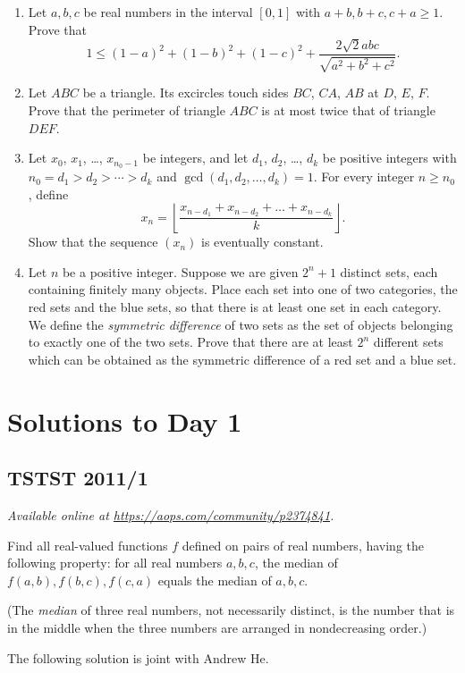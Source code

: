 \documentclass[11pt]{scrartcl}
\begin{document}
\begin{enumerate}[\bfseries 1.]
\item %
Let $a,b,c$ be real numbers in the interval $[0,1]$
with $a+b,b+c,c+a \ge 1$.  Prove that
\[ 1 \le (1-a)^2 + (1-b)^2 + (1-c)^2
  + \frac{2\sqrt2 abc}{\sqrt{a^2+b^2+c^2}}. \]

\item %
Let $ABC$ be a triangle.
Its excircles touch sides $BC$, $CA$, $AB$ at $D$, $E$, $F$.
Prove that the perimeter of triangle $ABC$ is
at most twice that of triangle $DEF$.

\item %
Let $x_0$, $x_1$, \dots, $x_{n_0-1}$ be integers,
and let $d_1$, $d_2$, \dots, $d_k$ be positive integers
with $n_0 = d_1 > d_2 > \dotsb > d_k$ and
$\gcd(d_1, d_2, \dots, d_k) = 1$.
For every integer $n \geq n_0$, define
\[ x_n = \left\lfloor \frac{x_{n-d_1} + x_{n-d_2}
  + \dots + x_{n-d_k}}{k} \right\rfloor. \]
Show that the sequence $(x_n)$ is eventually constant.

\item %
Let $n$ be a positive integer.
Suppose we are given $2^n+1$ distinct sets,
each containing finitely many objects.
Place each set into one of two categories, the red sets and the blue sets,
so that there is at least one set in each category.
We define the \textit{symmetric difference} of two sets as
the set of objects belonging to exactly one of the two sets.
Prove that there are at least $2^n$ different sets which
can be obtained as the symmetric difference of a red set and a blue set.

\end{enumerate}
\pagebreak

\section{Solutions to Day 1}
\subsection{TSTST 2011/1}
\textsl{Available online at \url{https://aops.com/community/p2374841}.}
\begin{mdframed}[style=mdpurplebox,frametitle={Problem statement}]
Find all real-valued functions $f$ defined on pairs of real numbers,
having the following property: for all real numbers $a, b, c$,
the median of $f(a,b), f(b,c), f(c,a)$ equals the median of $a, b, c$.

(The \emph{median} of three real numbers, not necessarily distinct,
is the number that is in the middle when the three numbers
are arranged in nondecreasing order.)
\end{mdframed}
The following solution is joint with Andrew He.
\end{document}
